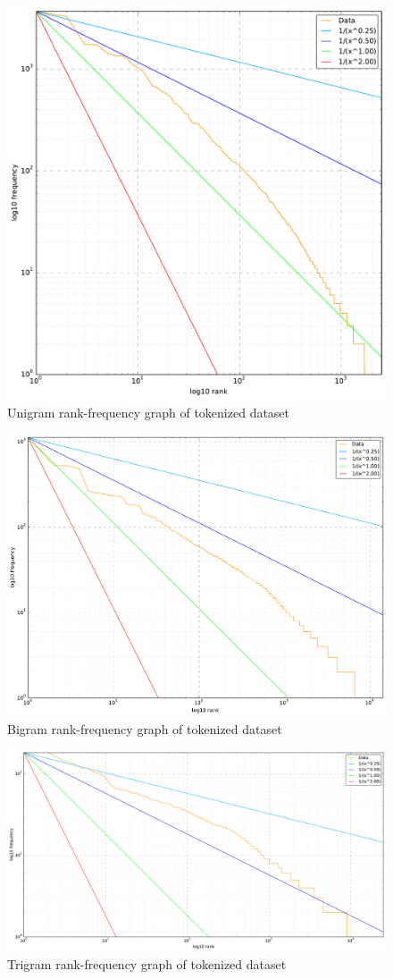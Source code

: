 \begin{figure}[hb]
	\centering
	\includegraphics[width=0.7\linewidth]{figures/frequency-graphs/1-gram}
	\caption{Unigram rank-frequency graph of tokenized dataset}
	\label{fig:rank-frequency-unigram}
\end{figure}

\begin{figure}[ht]
	\centering
	\includegraphics[width=0.85\linewidth]{figures/frequency-graphs/2-gram}
	\caption{Bigram rank-frequency graph of tokenized dataset}
	\label{fig:rank-frequency-bigram}
\end{figure}

\begin{figure}[ht]
	\centering
	\includegraphics[width=0.85\linewidth]{figures/frequency-graphs/3-gram}
	\caption{Trigram rank-frequency graph of tokenized dataset}
	\label{fig:rank-frequency-trigram}
\end{figure}

